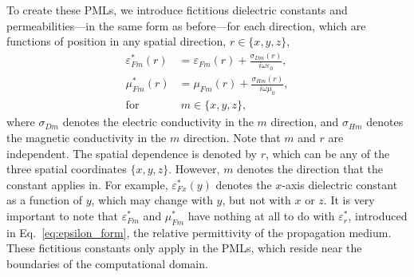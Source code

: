 \documentclass[12pt,twocolumn]{article}
\begin{document}
To create these PMLs, we introduce fictitious dielectric constants and permeabilities---in the same form as before---for each direction, which are functions of position in any spatial direction, $r\in\{x,y,z\}$,
\begin{equation}
\label{eq:fictitious}
\begin{aligned}
\varepsilon_{Fm}^*(r) &= \varepsilon_{Fm}(r)+\frac{\sigma_{Dm}(r)}{i\omega\varepsilon_0},\\
\mu_{Fm}^*(r) &= \mu_{Fm}(r)+\frac{\sigma_{Hm}(r)}{i\omega\mu_0},\\
\mathrm{for}&~m\in\{x,y,z\},
\end{aligned}
\end{equation}
where $\sigma_{Dm}$ denotes the electric conductivity in the $m$ direction, and $\sigma_{Hm}$ denotes the magnetic conductivity in the $m$ direction. Note that $m$ and $r$ are independent. The spatial dependence is denoted by $r$, which can be any of the three spatial coordinates $\{x,y,z\}$. However, $m$ denotes the direction that the constant applies in. For example, $\varepsilon_{Fx}^*(y)$ denotes the $x$-axis dielectric constant as a function of $y$, which may change with $y$, but not with $x$ or $z$. It is very important to note that $\varepsilon_{Fm}^*$ and $\mu_{Fm}^*$ have nothing at all to do with $\varepsilon_r^*$, introduced in Eq.~\ref{eq:epsilon_form}, the relative permittivity of the propagation medium. These fictitious constants only apply in the PMLs, which reside near the boundaries of the computational domain.
\end{document}
